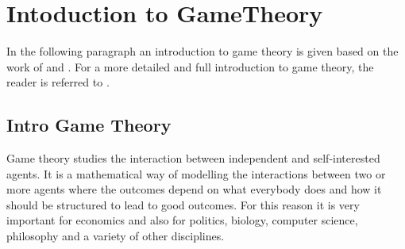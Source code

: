 \chapter{Intoduction to GameTheory}
\label{cha:1}
%



In the following paragraph an introduction to game theory is given based on the work of \citep{leyton2008essentials} and \citep{Coursera}. For a more detailed and full introduction to game theory, the reader is referred to \citep{leyton2008essentials}. 
\section{Intro Game Theory}
\label{Cha:1:Intro.Game.Theory}




Game theory studies the interaction between independent and self-interested agents. It is a mathematical way of modelling the interactions between two or more agents where the outcomes depend on what everybody does and how it should be structured to lead to good outcomes. For this reason it is very important for economics and also for politics, biology, computer science, philosophy and a variety of other disciplines.  \\

